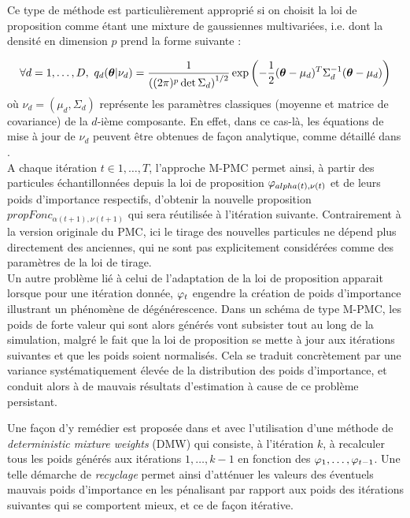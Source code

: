 Ce type de méthode est particulièrement approprié si on choisit la loi de proposition comme étant une mixture de gaussiennes multivariées, i.e. dont la densité en dimension $p$ prend la forme suivante : 

\begin{equation}
\forall d = 1, \dots, D, ~ q_d({\bm{\theta}}|\nu_d) = \dfrac{1}{\left((2\pi)^p\det \Sigma_d\right)^{1/2}}\exp\left(-\dfrac{1}{2}({\bm{\theta}} - \mu_d)^T \Sigma_d^{-1}({\bm{\theta}} - \mu_d)\right)
\label{eq_def_multivariate_gaussian}
\end{equation}
où $\nu_d = (\mu_d, \Sigma_d)$ représente les paramètres classiques (moyenne et matrice de covariance) de la $d$-ième composante. En effet, dans ce cas-là, les équations de mise à jour de $\nu_d$ peuvent être obtenues de façon analytique, comme détaillé dans \cite{Bilmes1998}. \\


A chaque itération $t \in {1, \dots, T}$, l'approche M-PMC permet ainsi, à partir des particules échantillonnées depuis la loi de proposition ${\varphi}_{alpha(t), \nu(t)}$ et de leurs poids d'importance respectifs, d'obtenir la nouvelle proposition $propFonc_{\alpha(t+1), \nu(t+1)}$ qui sera réutilisée à l'itération suivante. Contrairement à la version originale du PMC, ici le tirage des nouvelles particules ne dépend plus directement des anciennes, qui ne sont pas explicitement considérées comme des paramètres de la loi de tirage. \\

Un autre problème lié à celui de l'adaptation de la loi de proposition apparait lorsque pour une itération donnée, ${\varphi}_t$ engendre la création de poids d'importance illustrant un phénomène de dégénérescence. Dans un schéma de type M-PMC, les poids de forte valeur qui sont alors générés vont subsister tout au long de la simulation, malgré le fait que la loi de proposition se mette à jour aux itérations suivantes et que les poids soient normalisés. Cela se traduit concrètement par une variance systématiquement élevée de la distribution des poids d'importance, et conduit alors à de mauvais résultats d'estimation à cause de ce problème persistant.

Une façon d'y remédier est proposée dans \cite{Veach1995} et \cite{Owen2000} avec l'utilisation d'une méthode de \textit{deterministic mixture weights} (DMW) qui consiste, à l'itération $k$, à recalculer tous les poids générés aux itérations $1, \dots, k-1$ en fonction des ${\varphi}_1, \dots, {\varphi}_{t-1}$. Une telle démarche de \textit{recyclage} permet ainsi d'atténuer les valeurs des éventuels mauvais poids d'importance en les pénalisant par rapport aux poids des itérations suivantes qui se comportent mieux, et ce de façon itérative. 

